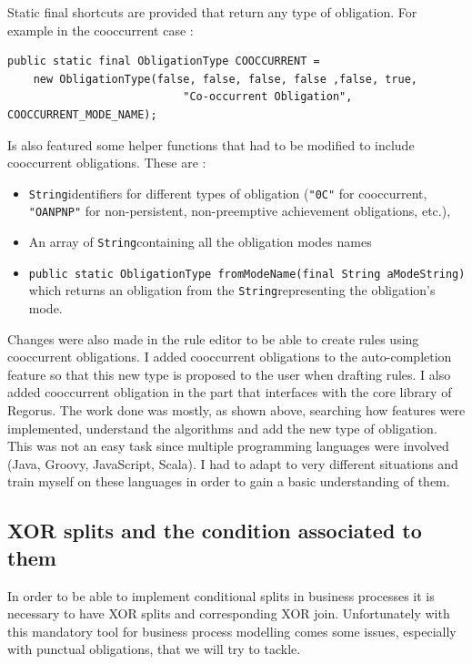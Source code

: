 \documentclass[10pt]{report}
\providecommand{\inlinecode}[1]{\lstinline$#1$} %
\newcommand{\String}{\inlinecode{String}}
\begin{document}
Static final shortcuts are provided that return any type of obligation. For example in the cooccurrent case : 
\begin{lstlisting}
public static final ObligationType COOCCURRENT = 
	new ObligationType(false, false, false, false ,false, true, 
                           "Co-occurrent Obligation", COOCCURRENT_MODE_NAME);
\end{lstlisting}

Is also featured some helper functions that had to be modified to include cooccurrent obligations. These are : 
\begin{itemize}
\item \String identifiers for different types of obligation (\inlinecode{"0C"} for cooccurrent, \inlinecode{"OANPNP"} for non-persistent, non-preemptive achievement obligations, etc.),
\item An array of \String containing all the obligation modes names
\item \inlinecode{public static ObligationType fromModeName(final String aModeString)} which returns an obligation from the \String representing the obligation's mode.  
\end{itemize}

Changes were also made in the rule editor to be able to create rules using cooccurrent obligations. I added cooccurrent obligations to the auto-completion feature so that this new type is proposed to the user when drafting rules. I also added cooccurrent obligation in the part that interfaces with the core library of Regorus. The work done was mostly, as shown above, searching how features were implemented, understand the algorithms and add the new type of obligation. This was not an easy task since multiple programming languages were involved (Java, Groovy, JavaScript, Scala). I had to adapt to very different situations and train myself on these languages in order to gain a basic understanding of them.



\subsection{XOR splits and the condition associated to them}
In order to be able to implement conditional splits in business processes it is necessary to have XOR splits and corresponding XOR join. Unfortunately with this mandatory tool for business process modelling comes some issues, especially with punctual obligations, that we will try to tackle.
\end{document}
